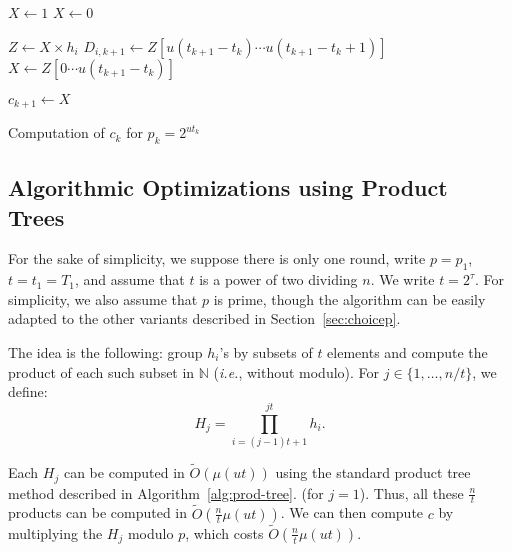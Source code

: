 \documentclass[twoside,envcountsame,runningheads]{llncs}
\newcommand{\Oapp}{\ensuremath{\tilde{O}}}
\newcommand{\ie}{\textit{i.e.}\xspace}
\begin{document}
\begin{algorithm}
\newcommand{\vstart}{\ensuremath{\mathrm{start}}}
\newcommand{\vmid}{\ensuremath{\mathrm{mid}}}
\newcommand{\vend}{\ensuremath{\mathrm{end}}}
\begin{algorithmic}[1]

  \State $X \gets 1$
\Else
  \State $X \gets 0$
\EndIf

  \State $Z \gets X \times h_i$
  \State $D_{i,k+1} \gets Z[u(t_{k+1}-t_k)\cdots u(t_{k+1}-t_k+1)]$
  \State $X \gets Z[0\cdots u(t_{k+1}-t_k)]$
\EndFor

\State $c_{k+1} \gets X$
\end{algorithmic}
\caption{Computation of $c_k$ for $p_k = 2^{ut_k}$}
\label{alg:even-p-c}
\end{algorithm}

\subsection{Algorithmic Optimizations using Product Trees}
\label{ap:algo-opt-prod-trees}

For the sake of simplicity, we suppose there is only one round, write $p=p_1$, $t=t_1=T_1$, and assume that $t$ is a power of two dividing $n$. We write $t = 2^\tau$.
For simplicity, we also assume that $p$ is prime, though the algorithm can be easily adapted to the other variants described in Section~\ref{sec:choicep}.

The idea is the following: group $h_i$'s by subsets of $t$ elements and compute the product of each such subset in $\mathbb{N}$ (\ie, without modulo). For $j \in \{1,\dots,n/t\}$, we define:
\[ H_j = \prod_{i=(j-1) t + 1}^{j t} h_i. \]

Each $H_j$ can be computed in $\Oapp(\mu(u t))$ using the standard product tree method described in Algorithm~\ref{alg:prod-tree}. (for $j=1$).
Thus, all these $\frac{n}{t}$ products can be computed in $\Oapp(\frac{n}{t} \mu(u t))$. We can then compute $c$ by multiplying the $H_j$ modulo $p$, which costs $\Oapp(\frac{n}{t} \mu(u t))$.
\end{document}
